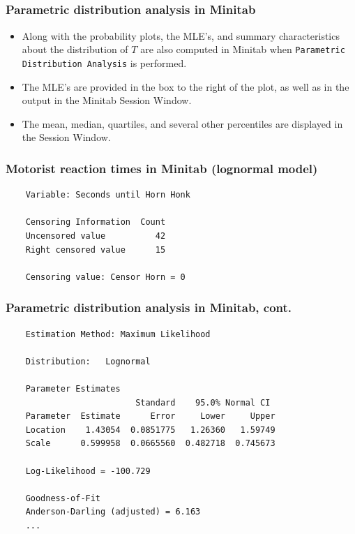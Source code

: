 \subsection{}
\begin{frame}
\end{frame}


\begin{frame}[fragile]
\frametitle{Parametric distribution analysis in Minitab}
\begin{itemize}
\item  Along with the probability plots, the MLE's, and summary characteristics about the distribution of $T$ are also computed in Minitab when \texttt{Parametric Distribution Analysis} is performed.

\item The MLE's are provided in the box to the right of the plot, as well as in the output in the Minitab Session Window.

\item The mean, median, quartiles, and several other percentiles are displayed in the Session Window.
\end{itemize}
\end{frame}

\begin{frame}[fragile]
\frametitle{Motorist reaction times in Minitab (lognormal model)}
\begin{verbatim}
    Variable: Seconds until Horn Honk

    Censoring Information  Count
    Uncensored value          42
    Right censored value      15

    Censoring value: Censor Horn = 0
\end{verbatim}
\end{frame}

\begin{frame}[fragile]
\frametitle{Parametric distribution analysis in Minitab, cont.}
\begin{verbatim}
    Estimation Method: Maximum Likelihood

    Distribution:   Lognormal

    Parameter Estimates
                          Standard    95.0% Normal CI
    Parameter  Estimate      Error     Lower     Upper
    Location    1.43054  0.0851775   1.26360   1.59749
    Scale      0.599958  0.0665560  0.482718  0.745673

    Log-Likelihood = -100.729

    Goodness-of-Fit
    Anderson-Darling (adjusted) = 6.163
    ...
\end{verbatim}
\end{frame}

